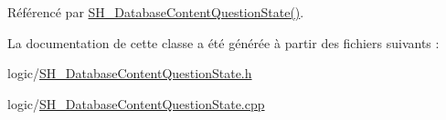 Référencé par \hyperlink{classSH__DatabaseContentQuestionState_ab26490ea519262a8f9ca72c000bf7313}{S\-H\-\_\-\-Database\-Content\-Question\-State()}.



La documentation de cette classe a été générée à partir des fichiers suivants \-:\begin{DoxyCompactItemize}
\item 
logic/\hyperlink{SH__DatabaseContentQuestionState_8h}{S\-H\-\_\-\-Database\-Content\-Question\-State.\-h}\item 
logic/\hyperlink{SH__DatabaseContentQuestionState_8cpp}{S\-H\-\_\-\-Database\-Content\-Question\-State.\-cpp}\end{DoxyCompactItemize}
